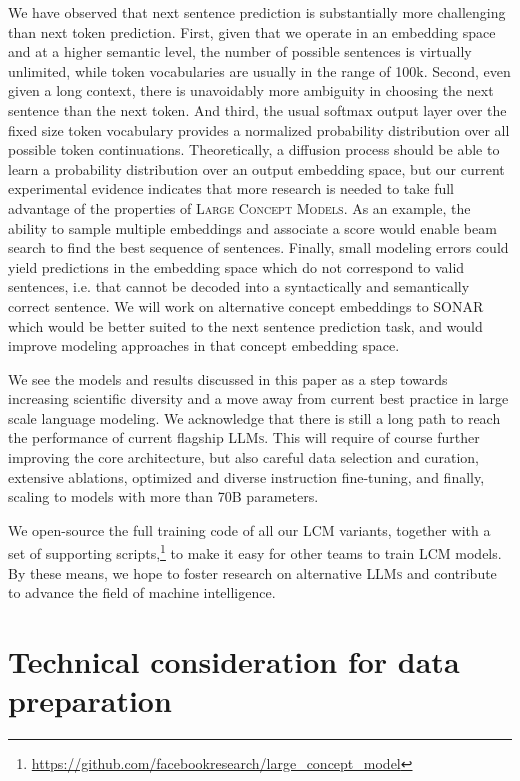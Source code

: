 \documentclass[twoside,11pt]{fairmeta}
\newcommand{\llms}{\textsc{LLMs}\xspace}
\newcommand{\sonar}{\textsc{SONAR}\xspace}
\newcommand{\lcm}{\textsc{LCM}\xspace}
\newcommand{\LCMs}{\textsc{Large Concept Models}\xspace}
\newcommand{\meresgithub}{\url{https://github.com/facebookresearch/large_concept_model}}
\begin{document}
We have observed that next sentence prediction is substantially more challenging than next token prediction.
First, given that we operate in an embedding space and at a higher semantic level, the number of possible sentences is virtually unlimited, while token vocabularies are usually in the range of 100k. Second, even given a long context, there is unavoidably more ambiguity in choosing the next sentence than the next token. And third, the usual softmax output layer over the fixed size token vocabulary provides a normalized probability distribution over all possible token continuations. Theoretically, a diffusion process should be able to learn a probability distribution over an output embedding space, but our current experimental evidence indicates that more research is needed to take full advantage of the properties of \LCMs. As an example, the ability to sample multiple embeddings and associate a score would enable beam search to find the best sequence of sentences.
Finally, small modeling errors could yield predictions in the embedding space which do not correspond to valid sentences, i.e. that cannot be decoded into a syntactically and semantically correct sentence. We will work on alternative concept embeddings to \sonar which would be better suited to the next sentence prediction task, and would improve modeling approaches in that concept embedding space.

We see the models and results discussed in this paper as a step towards increasing scientific diversity and a move away from current best practice in large scale language modeling.
We acknowledge that there is still a long path to reach the performance of current flagship \llms. This will require of course further improving the core architecture, but also careful data selection and curation, extensive ablations, optimized and diverse instruction fine-tuning, and finally, scaling to models with more than 70B parameters.

We open-source the full training code of all our \lcm variants, together with a set of supporting scripts,\footnote{\meresgithub} to make it easy for other teams to train \lcm models.
By these means, we hope to foster research on alternative \llms and contribute to advance the field of machine intelligence.
%
\newpage

\appendix
{}

\section[Data]{Technical consideration for data preparation}
\label{app:data:technic}
\end{document}
